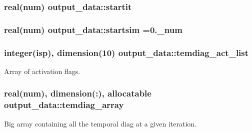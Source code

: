 \subsubsection[{\texorpdfstring{startit}{startit}}]{\setlength{\rightskip}{0pt plus 5cm}real(num) output\+\_\+data\+::startit}\hypertarget{namespaceoutput__data_a41d55c93b7330583e6a58d151f8d187b}{}\label{namespaceoutput__data_a41d55c93b7330583e6a58d151f8d187b}
\subsubsection[{\texorpdfstring{startsim}{startsim}}]{\setlength{\rightskip}{0pt plus 5cm}real(num) output\+\_\+data\+::startsim =0.\+\_\+num}\hypertarget{namespaceoutput__data_a3eebf5510f6656fe8385302d2aba28d5}{}\label{namespaceoutput__data_a3eebf5510f6656fe8385302d2aba28d5}
\subsubsection[{\texorpdfstring{temdiag\+\_\+act\+\_\+list}{temdiag_act_list}}]{\setlength{\rightskip}{0pt plus 5cm}integer(isp), dimension(10) output\+\_\+data\+::temdiag\+\_\+act\+\_\+list}\hypertarget{namespaceoutput__data_a63d2f446c4aca8bf956973b6ff9bcfb0}{}\label{namespaceoutput__data_a63d2f446c4aca8bf956973b6ff9bcfb0}


Array of activation flags. 

\subsubsection[{\texorpdfstring{temdiag\+\_\+array}{temdiag_array}}]{\setlength{\rightskip}{0pt plus 5cm}real(num), dimension(\+:), allocatable output\+\_\+data\+::temdiag\+\_\+array}\hypertarget{namespaceoutput__data_a034b19d2c3a5211b1fd96df24cd28dd1}{}\label{namespaceoutput__data_a034b19d2c3a5211b1fd96df24cd28dd1}


Big array containing all the temporal diag at a given iteration. 

